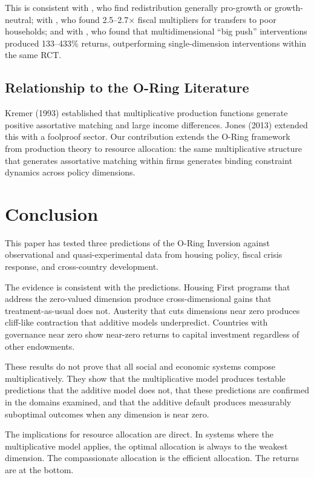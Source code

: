 \documentclass[12pt]{article}
\begin{document}
This is consistent with \citet{ostry2014redistribution}, who find redistribution generally pro-growth or growth-neutral; with \citet{egger2022kenya}, who found 2.5--2.7$\times$ fiscal multipliers for transfers to poor households; and with \citet{banerjee2015brac}, who found that multidimensional ``big push'' interventions produced 133--433\% returns, outperforming single-dimension interventions within the same RCT.

\subsection{Relationship to the O-Ring Literature}

Kremer (1993) established that multiplicative production functions generate positive assortative matching and large income differences. Jones (2013) extended this with a foolproof sector. Our contribution extends the O-Ring framework from production theory to resource allocation: the same multiplicative structure that generates assortative matching within firms generates binding constraint dynamics across policy dimensions.


\section{Conclusion}
\label{sec:conclusion}

This paper has tested three predictions of the O-Ring Inversion against observational and quasi-experimental data from housing policy, fiscal crisis response, and cross-country development.

The evidence is consistent with the predictions. Housing First programs that address the zero-valued dimension produce cross-dimensional gains that treatment-as-usual does not. Austerity that cuts dimensions near zero produces cliff-like contraction that additive models underpredict. Countries with governance near zero show near-zero returns to capital investment regardless of other endowments.

These results do not prove that all social and economic systems compose multiplicatively. They show that the multiplicative model produces testable predictions that the additive model does not, that these predictions are confirmed in the domains examined, and that the additive default produces measurably suboptimal outcomes when any dimension is near zero.

The implications for resource allocation are direct. In systems where the multiplicative model applies, the optimal allocation is always to the weakest dimension. The compassionate allocation is the efficient allocation. The returns are at the bottom.
\end{document}
